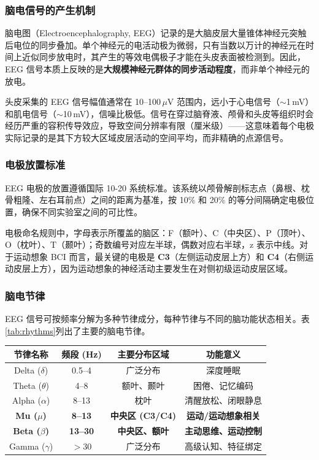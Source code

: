 \subsubsection{脑电信号的产生机制}

脑电图（Electroencephalography, EEG）记录的是大脑皮层大量锥体神经元突触后电位的同步叠加。单个神经元的电活动极为微弱，只有当数以万计的神经元在时间上近似同步放电时，其产生的等效电偶极子才能在头皮表面被检测到。因此，EEG 信号本质上反映的是\textbf{大规模神经元群体的同步活动程度}，而非单个神经元的放电。

头皮采集的 EEG 信号幅值通常在 10--100\,$\mu$V 范围内，远小于心电信号（$\sim$1\,mV）和肌电信号（$\sim$10\,mV），信噪比极低。信号在穿过脑脊液、颅骨和头皮等组织时会经历严重的容积传导效应，导致空间分辨率有限（厘米级）——这意味着每个电极实际记录的是其下方较大区域皮层活动的空间平均，而非精确的点源信号。

\subsubsection{电极放置标准}

EEG 电极的放置遵循国际 10-20 系统标准。该系统以颅骨解剖标志点（鼻根、枕骨粗隆、左右耳前点）之间的距离为基准，按 10\% 和 20\% 的等分间隔确定电极位置，确保不同实验室之间的可比性。

电极命名规则中，字母表示所覆盖的脑区：F（额叶）、C（中央区）、P（顶叶）、O（枕叶）、T（颞叶）；奇数编号对应左半球，偶数对应右半球，z 表示中线。对于运动想象 BCI 而言，最关键的电极是 \textbf{C3}（左侧运动皮层上方）和 \textbf{C4}（右侧运动皮层上方），因为运动想象的神经活动主要发生在对侧初级运动皮层区域。

\subsubsection{脑电节律}

EEG 信号可按频率分解为多种节律成分，每种节律与不同的脑功能状态相关。表\ref{tab:rhythms}列出了主要的脑电节律。

\begin{table}[htbp]
	\centering
	\begin{tabular}{cccc}
		\toprule
		节律名称 & 频段 (Hz) & 主要分布区域 & 功能意义 \\
		\midrule
		Delta ($\delta$) & 0.5--4 & 广泛分布 & 深度睡眠 \\
		Theta ($\theta$) & 4--8 & 额叶、颞叶 & 困倦、记忆编码 \\
		Alpha ($\alpha$) & 8--13 & 枕叶 & 清醒放松、闭眼静息 \\
		\textbf{Mu ($\mu$)} & \textbf{8--13} & \textbf{中央区 (C3/C4)} & \textbf{运动/运动想象相关} \\
		\textbf{Beta ($\beta$)} & \textbf{13--30} & \textbf{中央区、额叶} & \textbf{主动思维、运动控制} \\
		Gamma ($\gamma$) & $>$30 & 广泛分布 & 高级认知、特征绑定 \\
		\bottomrule
	\end{tabular}
\end{table}

